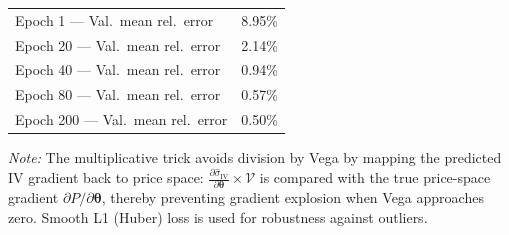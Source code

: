 \begin{table}[htbp]
\begin{tabular}{lc}
    \quad Epoch 1  — Val.\ mean rel.\ error  & 8.95\% \\
    \quad Epoch 20 — Val.\ mean rel.\ error  & 2.14\% \\
    \quad Epoch 40 — Val.\ mean rel.\ error  & 0.94\% \\
    \quad Epoch 80 — Val.\ mean rel.\ error  & 0.57\% \\
    \quad Epoch 200 — Val.\ mean rel.\ error & 0.50\% \\
    \bottomrule
  \end{tabular}
  \begin{tablenotes}
    \small
    \item \textit{Note:} The multiplicative trick avoids division by Vega by mapping the predicted IV gradient back to price space: $\frac{\partial\hat{\sigma}_{\text{IV}}}{\partial\boldsymbol{\theta}}\times\mathcal{V}$ is compared with the true price-space gradient $\partial P/\partial\boldsymbol{\theta}$, thereby preventing gradient explosion when Vega approaches zero. Smooth L1 (Huber) loss is used for robustness against outliers.
  \end{tablenotes}
\end{table}
